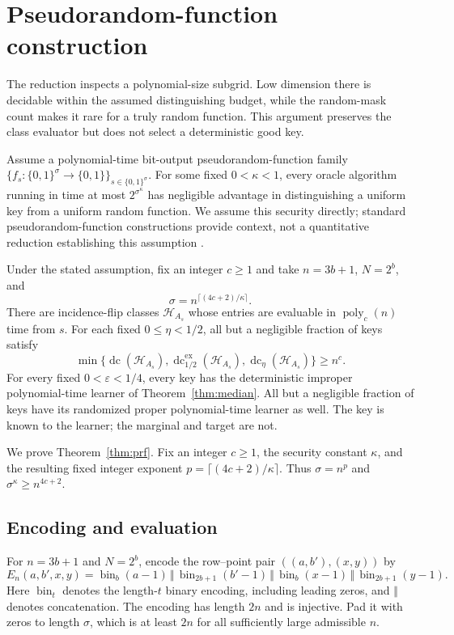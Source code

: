 \documentclass[11pt,letterpaper,pmlr,twoside]{jmlr}
\newcommand{\Hc}{\mathcal H}
\newcommand{\eps}{\varepsilon}
\newcommand{\dc}{\operatorname{dc}}
\newcommand{\edc}{\operatorname{dc}^{\mathrm{ex}}_{1/2}}
\newcommand{\poly}{\operatorname{poly}}
\newcommand{\ceil}[1]{\lceil #1\rceil}
\begin{document}
\section{Pseudorandom-function construction}
\label{app:prf}
The reduction inspects a polynomial-size subgrid. Low dimension there is decidable within the assumed distinguishing budget, while the random-mask count makes it rare for a truly random function. This argument preserves the class evaluator but does not select a deterministic good key.

Assume a polynomial-time bit-output pseudorandom-function family $\{f_s:\{0,1\}^{\sigma}\to\{0,1\}\}_{s\in\{0,1\}^{\sigma}}$. For some fixed $0<\kappa<1$, every oracle algorithm running in time at most $2^{\sigma^\kappa}$ has negligible advantage in distinguishing a uniform key from a uniform random function. We assume this security directly; standard pseudorandom-function constructions provide context, not a quantitative reduction establishing this assumption \citep{GGM86}.

\begin{theorem}
\label{thm:prf}
Under the stated assumption, fix an integer $c\ge1$ and take $n=3b+1$, $N=2^b$, and
\begin{equation}
 \sigma=n^{\ceil{(4c+2)/\kappa}}.
\label{eq:keylength}
\end{equation}
There are incidence-flip classes $\Hc_{A_s}$ whose entries are evaluable in $\poly_c(n)$ time from $s$. For each fixed $0\le\eta<1/2$, all but a negligible fraction of keys satisfy
\begin{equation}
 \min\{\dc(\Hc_{A_s}),\edc(\Hc_{A_s}),\dc_\eta(\Hc_{A_s})\}\ge n^c.
\label{eq:keydim}
\end{equation}
For every fixed $0<\eps<1/4$, every key has the deterministic improper polynomial-time learner of Theorem~\ref{thm:median}. All but a negligible fraction of keys have its randomized proper polynomial-time learner as well. The key is known to the learner; the marginal and target are not.
\end{theorem}

We prove Theorem~\ref{thm:prf}. Fix an integer $c\ge1$, the security constant $\kappa$, and the resulting fixed integer exponent $p=\ceil{(4c+2)/\kappa}$. Thus $\sigma=n^p$ and $\sigma^\kappa\ge n^{4c+2}$.

\subsection{Encoding and evaluation}
For $n=3b+1$ and $N=2^b$, encode the row--point pair $((a,b'),(x,y))$ by
\begin{equation}
 E_n(a,b',x,y)=
 \operatorname{bin}_{b}(a-1)\,\Vert\,
 \operatorname{bin}_{2b+1}(b'-1)\,\Vert\,
 \operatorname{bin}_{b}(x-1)\,\Vert\,
 \operatorname{bin}_{2b+1}(y-1).
\label{eq:ambientencoding}
\end{equation}
Here $\operatorname{bin}_t$ denotes the length-$t$ binary encoding, including leading zeros, and $\Vert$ denotes concatenation. The encoding has length $2n$ and is injective. Pad it with zeros to length $\sigma$, which is at least $2n$ for all sufficiently large admissible $n$.
\end{document}
